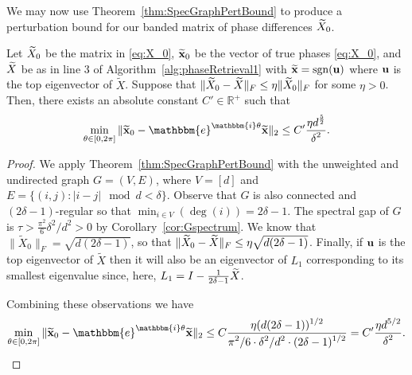 
We may now use Theorem~\ref{thm:SpecGraphPertBound} to produce a perturbation bound for our banded matrix of phase differences $\widetilde{X}_0$.%

\begin{corollary}
Let $\widetilde{X}_0$ be the matrix in \eqref{eq:X_0}, $\widetilde{\mathbf x}_0$ be the vector of true phases \eqref{eq:X_0}, and $\widetilde{X}$ be as in line 3 of Algorithm~\ref{alg:phaseRetrieval1} with $\widetilde{\mathbf x} = \mathrm{sgn}({\bf u})$ where ${\bf u}$ is the top eigenvector of $\widetilde{X}$. Suppose that 
$\Vert \widetilde{X}_0 - \widetilde{X} \Vert_F \le \eta \Vert \widetilde{X}_0 \Vert_F$ for some $\eta>0$.  Then, there exists an absolute constant $C' \in \mathbb{R}^+$ such that
\[\min_{\theta\in[0,2\pi]} \Vert \tx_0 - \mathbbm{e}^{\mathbbm{i}\theta} \tx \Vert_2 \le C' \bigfrac{\eta d^\frac{5}{2}}{\delta^{2}}.\]
\label{cor:GenBoundv2}
\end{corollary}

\begin{proof}
 We apply Theorem~\ref{thm:SpecGraphPertBound} with the unweighted and undirected graph $G = (V, E)$, where $V = [d]$ and $E = \{(i, j) : |i - j| \mod d < \delta\}$.  Observe that $G$ is also connected and $(2\delta - 1)$-regular so that $\min_{i \in V}(\deg(i)) = 2\delta - 1$.  The spectral gap of $G$ is $\tau > \frac{\pi^2}{6} \delta^2 / d^2 > 0$ by Corollary~\ref{cor:Gspectrum}.  We know that $\| \widetilde{X}_0 \|_F = \sqrt{d(2\delta - 1)}$, so that $\| \widetilde{X}_0 - \widetilde{X} \|_{F} \le \eta \sqrt{d(2\delta - 1)}$.  Finally, if ${\bf u}$ is the top eigenvector of $\widetilde{X}$ then it will also be an eigenvector of $L_1$ corresponding to its smallest eigenvalue since, here, $L_1 = I - \frac{1}{2 \delta - 1} \widetilde{X} $.

Combining these observations we have \[\min_{\theta\in[0,2\pi]} \Vert \tx_0 - \mathbbm{e}^{\mathbbm{i}\theta} \tx \Vert_2 \le C \bigfrac{\eta (d (2 \delta - 1))^{1/2}}{\pi^2 / 6 \cdot \delta^2 / d^2 \cdot (2 \delta - 1)^{1/2}} = C' \bigfrac{\eta d^{5/2}}{\delta^2}.\]
\end{proof}
